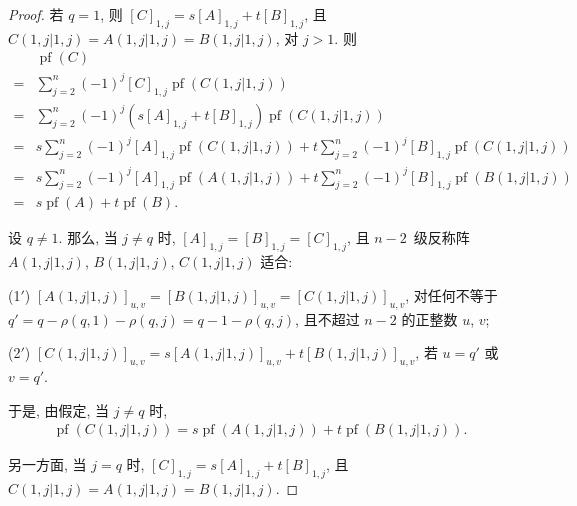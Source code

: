 \begin{proof}
    若 \(q = 1\), 则
    \([C]_{1,j} = s[A]_{1,j} + t[B]_{1,j}\),
    且 \(C({1,j}|{1,j}) = A({1,j}|{1,j}) = B({1,j}|{1,j})\),
    对 \(j > 1\).
    则
    \begin{align*}
             &
        \operatorname{pf} {(C)}
        \\
        = {} &
        \sum_{j=2}^{n}
        {(-1)^j [C]_{1,j}
        \operatorname{pf} {(C({1,j}|{1,j}))}}
        \\
        = {} &
        \sum_{j=2}^{n}
        {(-1)^j (s[A]_{1,j} + t[B]_{1,j})
        \operatorname{pf} {(C({1,j}|{1,j}))}}
        \\
        = {} &
        s \sum_{j=2}^{n}
        {(-1)^j [A]_{1,j}
        \operatorname{pf} {(C({1,j}|{1,j}))}}
        +
        t \sum_{j=2}^{n}
        {(-1)^j [B]_{1,j}
        \operatorname{pf} {(C({1,j}|{1,j}))}}
        \\
        = {} &
        s \sum_{j=2}^{n}
        {(-1)^j [A]_{1,j}
        \operatorname{pf} {(A({1,j}|{1,j}))}}
        +
        t \sum_{j=2}^{n}
        {(-1)^j [B]_{1,j}
        \operatorname{pf} {(B({1,j}|{1,j}))}}
        \\
        = {} &
        s \operatorname{pf} {(A)}
        + t \operatorname{pf} {(B)}.
    \end{align*}

    设 \(q \neq 1\).
    那么, 当 \(j \neq q\) 时,
    \([A]_{1,j} = [B]_{1,j} = [C]_{1,j}\),
    且 \(n-2\)~级反称阵
    \(A({1,j}|{1,j})\),
    \(B({1,j}|{1,j})\),
    \(C({1,j}|{1,j})\)
    适合:

    (1\ensuremath{'})
    \([A({1,j}|{1,j})]_{u,v}
    = [B({1,j}|{1,j})]_{u,v}
    = [C({1,j}|{1,j})]_{u,v}\),
    对任何不等于 \(q' = q - \rho(q, 1) - \rho(q, j)
    = q - 1 - \rho(q, j)\),
    且不超过 \(n-2\) 的正整数 \(u\), \(v\);

    (2\ensuremath{'})
    \([C({1,j}|{1,j})]_{u,v}
    = s [A({1,j}|{1,j})]_{u,v}
    + t [B({1,j}|{1,j})]_{u,v}\),
    若 \(u = q'\) 或 \(v = q'\).

    于是, 由假定, 当 \(j \neq q\) 时,
    \begin{align*}
        \operatorname{pf} {(C({1,j}|{1,j}))}
        = s \operatorname{pf} {(A({1,j}|{1,j}))}
        + t \operatorname{pf} {(B({1,j}|{1,j}))}.
    \end{align*}

    另一方面, 当 \(j = q\) 时,
    \([C]_{1,j} = s[A]_{1,j} + t[B]_{1,j}\),
    且 \(C({1,j}|{1,j}) = A({1,j}|{1,j}) = B({1,j}|{1,j})\).


\end{proof}
